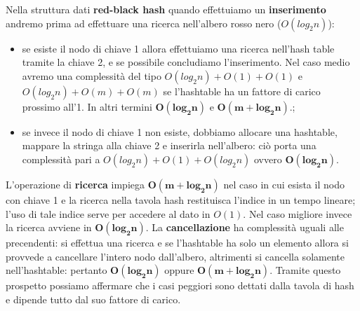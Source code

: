 \indent Nella struttura dati \textbf{red-black hash} quando effettuiamo un \textbf{inserimento} andremo prima
ad effettuare una ricerca nell'albero rosso nero ($O(log_2n)$):
\begin{itemize}
    \item se esiste il nodo di chiave 1 allora
effettuiamo una ricerca nell'hash table tramite la chiave 2, e se possibile concludiamo l'inserimento.
Nel caso medio avremo una complessit\`a del tipo
$O(log_2n) + O(1) + O(1)$ e $O(log_2n) + O(m) + O(m)$ se l'hashtable ha un fattore di carico prossimo
all'1. In altri termini $\mathbf{O(log_2n)}$ e $\mathbf{O(m+log_2n)}$.;
    \item se invece il nodo di chiave 1 non esiste, dobbiamo allocare una hashtable, mappare la stringa alla chiave 2
e inserirla nell'albero: ci\`o porta una complessit\`a pari a $O(log_2n) + O(1) +  O(log_2n)$ ovvero 
$\mathbf{O(log_2n)}$.
\end{itemize}
L'operazione di \textbf{ricerca} impiega $\mathbf{O(m+log_2n)}$ nel caso in cui esista il nodo
con chiave 1 e la ricerca nella tavola hash restituisca l'indice in un tempo lineare; l'uso di tale indice 
serve per accedere al dato in $O(1)$. Nel caso migliore invece la ricerca avviene in
$\mathbf{O(log_2n)}$.\newline
La \textbf{cancellazione} ha complessit\`a uguali alle precendenti: si effettua una ricerca e
se l'hashtable ha solo un elemento allora si provvede a cancellare l'intero nodo dall'albero, altrimenti
si cancella solamente nell'hashtable: pertanto $\mathbf{O(log_2n)}$ oppure $\mathbf{O(m+log_2n)}$.
\newline
Tramite questo prospetto possiamo affermare che i casi peggiori sono dettati dalla tavola di hash e dipende
tutto dal suo fattore di carico.